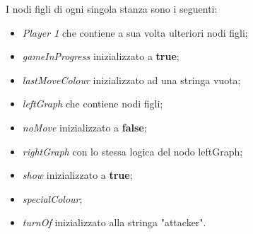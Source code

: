 \documentclass[a4paper,12pt,twoside,openright]{report}
\begin{document}
I nodi figli di ogni singola stanza sono i seguenti:

\begin{itemize}
\item \textit{Player 1} che contiene a sua volta ulteriori nodi figli;

\item \textit{gameInProgress} inizializzato a \textbf{true};

\item \textit{lastMoveColour} inizializzato ad una stringa vuota;

\item \textit{leftGraph} che contiene nodi figli;

\item \textit{noMove} inizializzato a \textbf{false};

\item \textit{rightGraph} con lo stessa logica del nodo leftGraph;

\item \textit{show} inizializzato a \textbf{true};

\item \textit{specialColour};

\item \textit{turnOf} inizializzato alla stringa "attacker".
\end{itemize}
\end{document}
